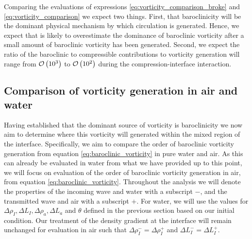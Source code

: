Comparing the evaluations of expressions
\eqref{eq:vorticity_comparison_broke} and
\eqref{eq:vorticity_comparison} we expect two things. First, that
baroclinicity will be the dominant physical mechanism by which
circulation is generated. Hence, we expect
that \label{eq:vorticity_comparison_broke} is likely to overestimate
the dominance of baroclinic vorticity after a small amount of
baroclinic vorticity has been generated. Second, we expect the ratio
of the baroclinic to compressible contributions to vorticity
generation will range from $\mathcal{O}\left(10^3\right)$ to $\mathcal{O}\left(10^2\right)$ during
the compression-interface interaction.

\subsection{Comparison of vorticity generation in air and water}
Having established that the dominant source of vorticity is
baroclinicity we now aim to determine where this vorticity will
generated within the mixed region of the interface. Specifically, we
aim to compare the order of baroclinic vorticity generation from
equation \eqref{eq:baroclinic_vorticity} in pure water and air. As
this can already be evaluated in water from what we have provided up
to this point, we will focus on evaluation of the order of baroclinic
vorticity generation in air, from equation
\eqref{eq:baroclinic_vorticity}. Throughout the analysis we will
denote the properties of the incoming wave and water with a subscript
$-$, and the transmitted wave and air with a subscript $+$. For water,
we will use the values for
$\Delta \rho_I, \Delta L_I, \Delta \rho_a, \Delta L_a$ and $\theta$
defined in the previous section based on our initial condition. Our
treatment of the density gradient at the interface will remain
unchanged for evaluation in air such that
$\Delta \rho_I^-=\Delta \rho_I^+$ and $\Delta L_I^-=\Delta L_I^+$.

